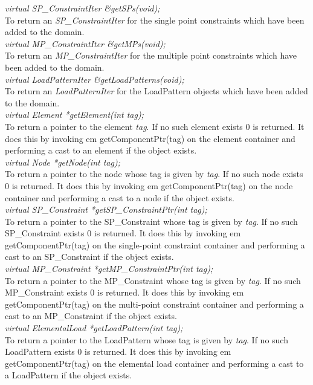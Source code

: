 {\em virtual SP\_ConstraintIter \&getSPs(void);} \\
To return an {\em SP\_ConstraintIter} for the single point constraints
which have been added to the domain. \\ 

{\em virtual MP\_ConstraintIter \&getMPs(void);} \\
To return an {\em MP\_ConstraintIter} for the multiple point
constraints which have been added to the domain. \\ 

{\em virtual LoadPatternIter \&getLoadPatterns(void);} \\
To return an {\em LoadPatternIter} for the LoadPattern
objects which have been added to the domain. \\ 

{\em virtual  Element *getElement(int tag);}\\
To return a pointer to the element {\em tag}. If no such element
exists $0$ is returned. It does this by invoking {em
getComponentPtr(tag)} on the element container and performing a cast
to an element if the object exists. \\

{\em virtual  Node *getNode(int tag);}\\
To return a pointer to the node whose tag is given by {\em tag}. If
no such node exists $0$ is returned. It does this by invoking {em
getComponentPtr(tag)} on the node container and performing a cast
to a node if the object exists. \\

{\em virtual  SP\_Constraint *getSP\_ConstraintPtr(int tag);}\\
To return a pointer to the SP\_Constraint whose tag is given by {\em tag}. If
no such SP\_Constraint exists $0$ is returned. It does this by invoking {em
getComponentPtr(tag)} on the single-point constraint container and
performing a cast to an SP\_Constraint if the object exists. \\


{\em virtual  MP\_Constraint *getMP\_ConstraintPtr(int tag);}\\
To return a pointer to the MP\_Constraint whose tag is given by {\em tag}. If
no such MP\_Constraint exists $0$ is returned. It does this by invoking {em
getComponentPtr(tag)} on the multi-point constraint container and
performing a cast to an MP\_Constraint if the object exists. \\


{\em virtual  ElementalLoad *getLoadPattern(int tag);}\\
To return a pointer to the LoadPattern whose tag is given by {\em tag}. If
no such LoadPattern exists $0$ is returned. It does this by invoking {em
getComponentPtr(tag)} on the elemental load container and
performing a cast to a LoadPattern if the object exists. \\


